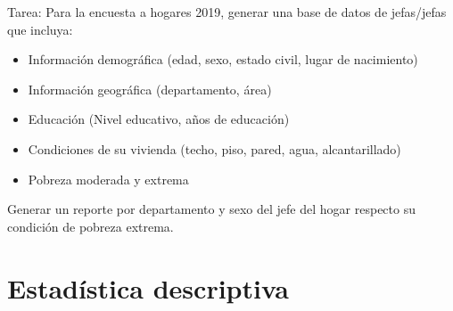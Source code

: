 \documentclass[
]{book}
\newenvironment{Shaded}{\begin{snugshade}}{\end{snugshade}}
\newcommand{\CommentTok}[1]{\textcolor[rgb]{0.56,0.35,0.01}{\textit{#1}}}
\newcommand{\DataTypeTok}[1]{\textcolor[rgb]{0.13,0.29,0.53}{#1}}
\newcommand{\DecValTok}[1]{\textcolor[rgb]{0.00,0.00,0.81}{#1}}
\newcommand{\KeywordTok}[1]{\textcolor[rgb]{0.13,0.29,0.53}{\textbf{#1}}}
\newcommand{\NormalTok}[1]{#1}
\newcommand{\OperatorTok}[1]{\textcolor[rgb]{0.81,0.36,0.00}{\textbf{#1}}}
\newcommand{\StringTok}[1]{\textcolor[rgb]{0.31,0.60,0.02}{#1}}
\providecommand{\tightlist}{%
  \setlength{\itemsep}{0pt}\setlength{\parskip}{0pt}}
\begin{document}
Tarea: Para la encuesta a hogares 2019, generar una base de datos de jefas/jefas que incluya:

\begin{itemize}
\tightlist
\item
  Información demográfica (edad, sexo, estado civil, lugar de nacimiento)
\item
  Información geográfica (departamento, área)
\item
  Educación (Nivel educativo, años de educación)
\item
  Condiciones de su vivienda (techo, piso, pared, agua, alcantarillado)
\item
  Pobreza moderada y extrema
\end{itemize}

Generar un reporte por departamento y sexo del jefe del hogar respecto su condición de pobreza extrema.

\begin{Shaded}
\end{Shaded}

\hypertarget{estaduxedstica-descriptiva}{%
\section{Estadística descriptiva}\label{estaduxedstica-descriptiva}}
\end{document}
